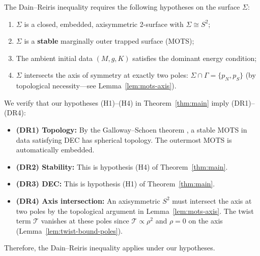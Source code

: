 \begin{remark}\label{rem:dain-reiris-hypotheses}
The Dain--Reiris inequality \cite{dain2011} requires the following hypotheses on the surface $\Sigma$:
\begin{enumerate}
    \item[(DR1)] $\Sigma$ is a closed, embedded, axisymmetric 2-surface with $\Sigma \cong S^2$;
    \item[(DR2)] $\Sigma$ is a \textbf{stable} marginally outer trapped surface (MOTS);
    \item[(DR3)] The ambient initial data $(M, g, K)$ satisfies the dominant energy condition;
    \item[(DR4)] $\Sigma$ intersects the axis of symmetry at exactly two poles: $\Sigma \cap \Gamma = \{p_N, p_S\}$ (by topological necessity---see Lemma~\ref{lem:mots-axis}).
\end{enumerate}

We verify that our hypotheses (H1)--(H4) in Theorem~\ref{thm:main} imply (DR1)--(DR4):
\begin{itemize}
    \item \textbf{(DR1) Topology:} By the Galloway--Schoen theorem \cite{gallowayschoen2006}, a stable MOTS in data satisfying DEC has spherical topology. The outermost MOTS is automatically embedded.
    \item \textbf{(DR2) Stability:} This is hypothesis (H4) of Theorem~\ref{thm:main}.
    \item \textbf{(DR3) DEC:} This is hypothesis (H1) of Theorem~\ref{thm:main}.
    \item \textbf{(DR4) Axis intersection:} An axisymmetric $S^2$ must intersect the axis at two poles by the topological argument in Lemma~\ref{lem:mots-axis}. The twist term $\mathcal{T}$ vanishes at these poles since $\mathcal{T} \propto \rho^2$ and $\rho = 0$ on the axis (Lemma~\ref{lem:twist-bound-poles}).
\end{itemize}
Therefore, the Dain--Reiris inequality applies under our hypotheses.
\end{remark}


